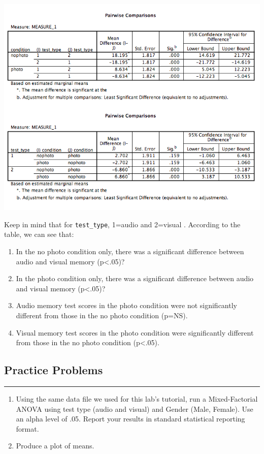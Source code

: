 \documentclass[
]{book}
\providecommand{\tightlist}{%
  \setlength{\itemsep}{0pt}\setlength{\parskip}{0pt}}
\begin{document}
\includegraphics{img/11.4.24.png}

Keep in mind that for \texttt{test\_type}, 1=audio and 2=visual
.
According to the table, we can see that:

\begin{enumerate}
\def\labelenumi{\arabic{enumi}.}
\tightlist
\item
  In the no photo condition only, there was a significant difference between audio and visual memory (p\textless.05)?
\item
  In the photo condition only, there was a significant difference between audio and visual memory (p\textless.05)?
\item
  Audio memory test scores in the photo condition were not significantly different from those in the no photo condition (p=NS).
\item
  Visual memory test scores in the photo condition were significantly different from those in the no photo condition (p\textless.05).
\end{enumerate}

\hypertarget{practice-problems-10}{%
\subsection{Practice Problems}\label{practice-problems-10}}

\begin{center}\rule{0.5\linewidth}{0.5pt}\end{center}

\begin{enumerate}
\def\labelenumi{\arabic{enumi}.}
\item
  Using the same data file we used for this lab's tutorial, run a Mixed-Factorial ANOVA using test type (audio and visual) and Gender (Male, Female). Use an alpha level of .05. Report your results in standard statistical reporting format.
\item
  Produce a plot of means.
\end{enumerate}
\end{document}
